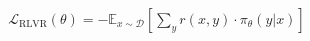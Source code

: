 \documentclass[preview]{standalone}
\begin{document}
\begin{align*}
\mathcal{L}_{\mathrm{RLVR}}(\theta) = -\mathbb{E}_{x \sim \mathcal{D}}\left[\sum_{y} r(x, y)\cdot\pi_{\theta}(y|x)\right]
\end{align*}
\end{document}
